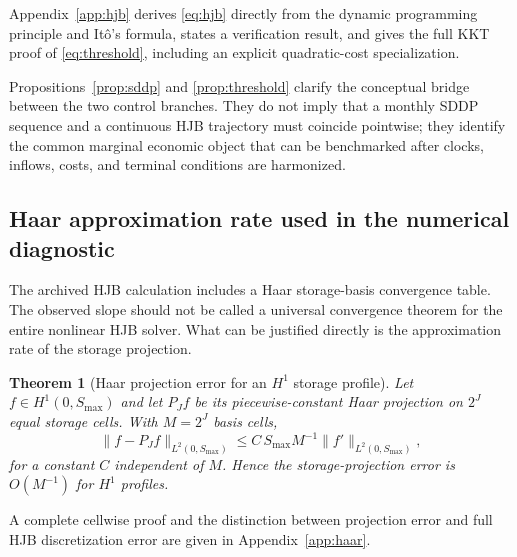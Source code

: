 \documentclass[11pt,a4paper]{article}
\newtheorem{theorem}{Theorem}
\begin{document}
\noindent Appendix~\ref{app:hjb} derives \eqref{eq:hjb} directly from the dynamic
programming principle and It\^o's formula, states a verification result, and gives
the full KKT proof of \eqref{eq:threshold}, including an explicit quadratic-cost
specialization.

Propositions~\ref{prop:sddp} and \ref{prop:threshold} clarify the conceptual
bridge between the two control branches. They do not imply that a monthly SDDP
sequence and a continuous HJB trajectory must coincide pointwise; they identify
the common marginal economic object that can be benchmarked after clocks,
inflows, costs, and terminal conditions are harmonized.

\subsection{Haar approximation rate used in the numerical diagnostic}
The archived HJB calculation includes a Haar storage-basis convergence table.
The observed slope should not be called a universal convergence theorem for the
entire nonlinear HJB solver. What can be justified directly is the approximation
rate of the storage projection.

\begin{theorem}[Haar projection error for an $H^1$ storage profile]\label{thm:haar}
Let $f\in H^1(0,S_{\max})$ and let $P_Jf$ be its piecewise-constant Haar
projection on $2^J$ equal storage cells. With $M=2^J$ basis cells,
\begin{equation}
 \|f-P_Jf\|_{L^2(0,S_{\max})}
 \le C\,S_{\max}M^{-1}\|f'\|_{L^2(0,S_{\max})},
 \label{eq:haar-rate}
\end{equation}
for a constant $C$ independent of $M$. Hence the storage-projection error is
$O(M^{-1})$ for $H^1$ profiles.
\end{theorem}

\noindent A complete cellwise proof and the distinction between projection error and
full HJB discretization error are given in Appendix~\ref{app:haar}.
\end{document}
